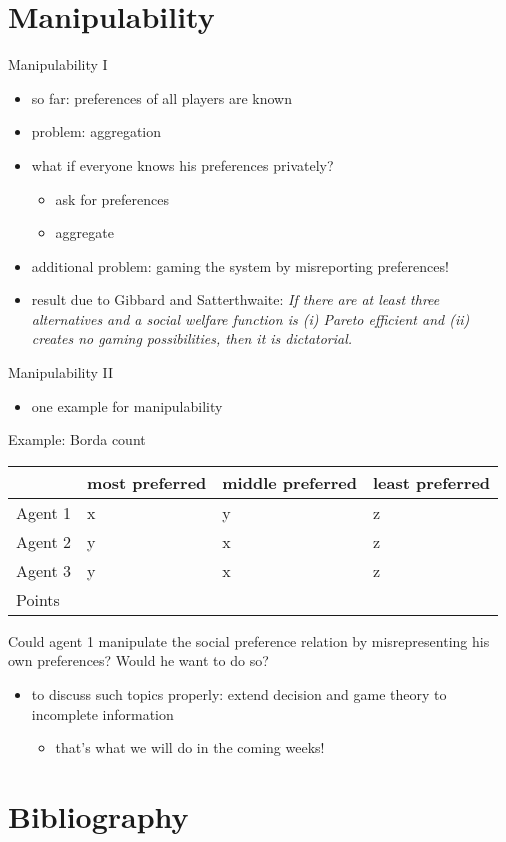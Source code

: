 \documentclass[bigger]{beamer}
\begin{document}
\section{Manipulability}
\label{sec:orgbaff1de}
\begin{frame}[label={sec:org500d1a4}]{Manipulability I}
\begin{itemize}
\item so far: preferences of all players are known
\item problem: aggregation
\item what if everyone knows his preferences privately?
\begin{itemize}
\item ask for preferences
\item aggregate
\end{itemize}
\item additional problem: gaming the system by misreporting preferences!
\item result due to Gibbard and Satterthwaite:\linebreak
\emph{If there are at least three alternatives and a social welfare function is (i) Pareto efficient and (ii) creates no gaming possibilities, then it is dictatorial.}
\end{itemize}
\end{frame}

\begin{frame}[label={sec:org9f36cbb}]{Manipulability II}
\begin{itemize}
\item one example for manipulability
\end{itemize}

\begin{block}{Example:   Borda count}
\begin{center}
\begin{tabular}{l|lll}
 & most preferred & middle preferred & least preferred\\
\hline
Agent 1 & x & y & z\\
Agent 2 & y & x & z\\
Agent 3 & y & x & z\\
\hline
Points &  &  & \\
\end{tabular}
\end{center}
Could agent 1 manipulate the social preference relation by misrepresenting his own preferences? Would he want to do so?
\end{block}
\begin{itemize}
\item to discuss such topics properly:\linebreak
extend decision and game theory to incomplete information
\begin{itemize}
\item that's what we will do in the coming weeks!
\end{itemize}
\end{itemize}
\end{frame}


\section{Bibliography}
\label{sec:org6662438}


\end{document}

